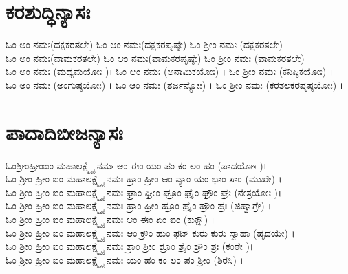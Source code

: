  \section{ಕರಶುದ್ಧಿನ್ಯಾಸಃ }
ಓಂ ಅಂ ನಮಃ(ದಕ್ಷಕರತಲೇ) ಓಂ ಆಂ ನಮಃ(ದಕ್ಷಕರಪೃಷ್ಠೇ) ಓಂ ಶ್ರೀಂ ನಮಃ (ದಕ್ಷಕರತಲೇ)\\
ಓಂ ಅಂ ನಮಃ(ವಾಮಕರತಲೇ) ಓಂ ಆಂ ನಮಃ(ವಾಮಕರಪೃಷ್ಠೇ) ಓಂ ಶ್ರೀಂ ನಮಃ (ವಾಮಕರತಲೇ)\\
ಓಂ ಅಂ ನಮಃ (ಮಧ್ಯಮಯೋಃ )। ಓಂ ಆಂ ನಮಃ (ಅನಾಮಿಕಯೋಃ) । ಓಂ ಶ್ರೀಂ ನಮಃ (ಕನಿಷ್ಠಿಕಯೋಃ) ।\\
ಓಂ ಅಂ ನಮಃ (ಅಂಗುಷ್ಠಯೋಃ)  । ಓಂ ಆಂ ನಮಃ (ತರ್ಜನ್ಯೋಃ) । ಓಂ ಶ್ರೀಂ ನಮಃ (ಕರತಲಕರಪೃಷ್ಠಯೋಃ) ।
\section{ಪಾದಾದಿಬೀಜನ್ಯಾಸಃ }
ಓಂಶ್ರೀಂಹ್ರೀಂಐಂ ಮಹಾಲಕ್ಷ್ಮ್ಯೈ ನಮಃ ಆಂ ಈಂ ಯಂ ಪಂ ಕಂ ಲಂ ಹಂ (ಪಾದಯೋಃ )।\\
ಓಂ ಶ್ರೀಂ ಹ್ರೀಂ ಐಂ ಮಹಾಲಕ್ಷ್ಮ್ಯೈ ನಮಃ ಹ್ರಾಂ ಹ್ರೀಂ ಆಂ ವ್ಯಾಂ ಯಂ ಭಾಂ ಸಾಂ (ಮುಖೇ) ।\\
ಓಂ ಶ್ರೀಂ ಹ್ರೀಂ ಐಂ ಮಹಾಲಕ್ಷ್ಮ್ಯೈ ನಮಃ ಘ್ರಾಂ ಘ್ರೀಂ ಘ್ರೂಂ ಘ್ರೈಂ ಘ್ರೌಂ ಘ್ರಃ (ನೇತ್ರಯೋಃ )।\\
ಓಂ ಶ್ರೀಂ ಹ್ರೀಂ ಐಂ ಮಹಾಲಕ್ಷ್ಮ್ಯೈ ನಮಃ ಹ್ರಾಂ ಹ್ರೀಂ ಹ್ರೂಂ ಹ್ರೈಂ ಹ್ರೌಂ ಹ್ರಃ (ಜಿಹ್ವಾಗ್ರೇ) ।\\
ಓಂ ಶ್ರೀಂ ಹ್ರೀಂ ಐಂ ಮಹಾಲಕ್ಷ್ಮ್ಯೈ ನಮಃ ಆಂ ಈಂ ಏಂ ಐಂ (ಕುಕ್ಷೌ) ।\\
ಓಂ ಶ್ರೀಂ ಹ್ರೀಂ ಐಂ ಮಹಾಲಕ್ಷ್ಮ್ಯೈ ನಮಃ ಆಂ ಕ್ರೌಂ ಹುಂ ಫಟ್ ಕುರು ಕುರು ಸ್ವಾಹಾ (ಹೃದಯೇ) ।\\
ಓಂ ಶ್ರೀಂ ಹ್ರೀಂ ಐಂ ಮಹಾಲಕ್ಷ್ಮ್ಯೈ ನಮಃ ಶ್ರಾಂ ಶ್ರೀಂ ಶ್ರೂಂ ಶ್ರೈಂ ಶ್ರೌಂ ಶ್ರಃ (ಕಂಠೇ )।\\
ಓಂ ಶ್ರೀಂ ಹ್ರೀಂ ಐಂ ಮಹಾಲಕ್ಷ್ಮ್ಯೈ ನಮಃ ಯಂ ಹಂ ಕಂ ಲಂ ಪಂ ಶ್ರೀಂ (ಶಿರಸಿ) ।
